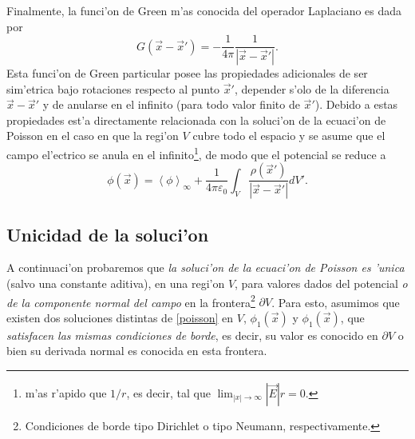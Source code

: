 Finalmente, la funci'on de Green m'as conocida del operador Laplaciano es dada por
\begin{equation}
G(\vec{x}-\vec{x}')=-\frac{1}{4\pi}\frac{1}{|\vec{x}-\vec{x}'|}.
\end{equation}
Esta funci'on de Green particular posee las propiedades adicionales de ser sim'etrica bajo rotaciones respecto al punto $\vec{x}'$, depender s'olo de la diferencia $\vec{x}-\vec{x}'$ y de anularse en el infinito (para todo valor finito de $\vec{x}'$). Debido a estas propiedades est'a directamente relacionada con la soluci'on de la ecuaci'on de Poisson en el caso en que la regi'on $V$ cubre todo el espacio y se asume que el campo el'ectrico se anula en el infinito\footnote{m'as r'apido que $1/r$, es decir, tal que $\lim_{|x|\to\infty}|\vec{E}|r=0$.}, de modo que el potencial se reduce a
\begin{equation}
\phi(\vec{x})= \left\langle\phi\right\rangle_\infty+\frac{1}{4\pi\varepsilon_0}\int_V\frac{\rho(\vec{x}')}{|\vec{x}-\vec{x}'|}dV'.
\end{equation}

\subsection{Unicidad de la soluci'on}\label{sec:uniP}
A continuaci'on probaremos que \textit{la soluci'on de la ecuaci'on de Poisson es 'unica} (salvo una constante aditiva), en una regi'on $V$, para valores dados del potencial \textit{o de la componente normal del campo} en la frontera\footnote{Condiciones de borde tipo Dirichlet o tipo Neumann, respectivamente.} $\partial V$. Para esto, asumimos que existen dos soluciones distintas de \eqref{poisson} en $V$, $\phi_1(\vec{x})$ y $\phi_1(\vec{x})$, que \textit{satisfacen las mismas condiciones de borde}, es decir, su valor es conocido en $\partial V$ o bien su derivada normal es conocida en esta frontera.

